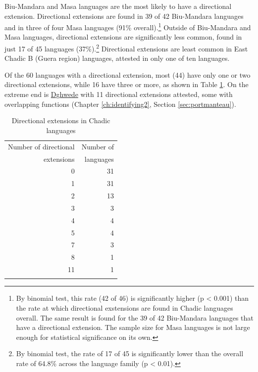 Biu-Mandara and Masa languages are the most likely to have a directional extension. Directional extensions are found in 39 of 42 Biu-Mandara languages and in three of four Masa languages (91\% overall).\footnote{By binomial test, this rate (42 of 46) is significantly higher (p < 0.001) than the rate at which directional exstensions are found in Chadic languages overall. The same result is found for the 39 of 42 Biu-Mandara languages that have a directional extension. The sample size for Masa languages is not large enough for statistical significance on its own.} Outside of Biu-Mandara and Masa languages, directional extensions are significantly less common, found in just 17 of 45 languages (37\%).\footnote{By binomial test, the rate of 17 of 45 is significantly lower than the overall rate of 64.8\% across the language family (p < 0.01).} Directional extensions are least common in East Chadic B (Guera region) languages, attested in only one of ten languages.

Of the 60 languages with a directional extension, most (44) have only one or two directional extensions, while 16 have three or more, as shown in Table \ref{tab:dirmorphs}. On the extreme end is \hyperref[dghw]{Dghwede} with 11 directional extensions attested, some with overlapping functions (Chapter \ref{ch:identifying2}, Section \ref{sec:portmanteau}). 

\begin{table}
	\caption{Directional extensions in Chadic languages}
	\label{tab:dirmorphs}
	\begin{tabular}{rr} %
		\lsptoprule
Number of directional & Number of \\
extensions & languages \\
\midrule
0  &	31 \\
1  &     31 \\
2  &     13 \\
3  &      3 \\
4  &      4 \\
5  &      4 \\
7  &      3 \\
8  &      1 \\
11 &      1 \\
		\lspbottomrule
	\end{tabular}
\end{table}



